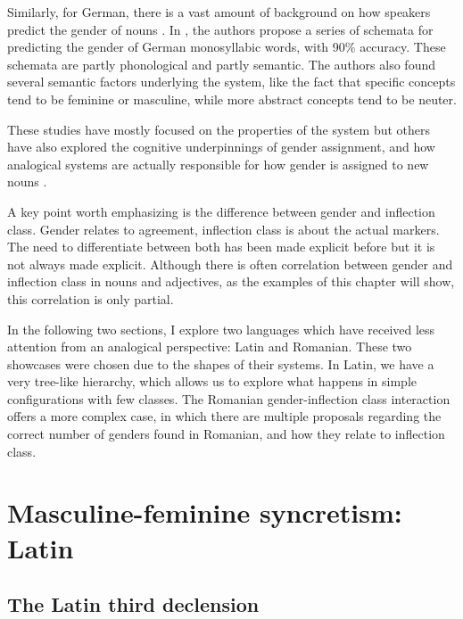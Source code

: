 Similarly, for German, there is a vast amount of background on how speakers predict the gender of nouns  \autocites{Hahn.2000, Kopcke.1984, Kopcke.2010, Salmons.1993, Schwichtenberg.2004, Zubin.1986, Zubin.1984}. In \textcite{Kopcke.1984}, the authors propose a series of schemata for predicting the gender of German monosyllabic words, with 90\% accuracy. These schemata are partly phonological and partly semantic. The authors also found several semantic factors underlying the system, like the fact that specific concepts tend to be feminine or masculine, while more abstract concepts tend to be neuter.

These studies have mostly focused on the properties of the system but others have also explored the cognitive underpinnings of gender assignment, and how analogical systems are actually responsible for how gender is assigned to new nouns \autocites{Holmes.2004, Caffarra.2015, Caffarra.2015a, Taylor.2012}.

A key point worth emphasizing is the difference between gender and inflection class. Gender relates to agreement, inflection class is about the actual markers. The need to differentiate between both has been made explicit before \autocite{Aronoff.1994, Harris.1991} but it is not always made explicit. Although there is often correlation between gender and inflection class in nouns and adjectives, as the examples of this chapter will show, this correlation is only partial.

In the following two sections, I explore two languages which have received less attention from an analogical perspective: Latin and Romanian. These two showcases were chosen due to the shapes of their systems. In Latin, we have a very tree-like hierarchy, which allows us to explore what happens in simple configurations with few classes. The Romanian gender-inflection class interaction offers a more complex case, in which there are multiple proposals regarding the correct number of genders found in Romanian, and how they relate to inflection class.

\newpage
\section{Masculine-feminine syncretism: Latin}

\subsection{The Latin third declension}

